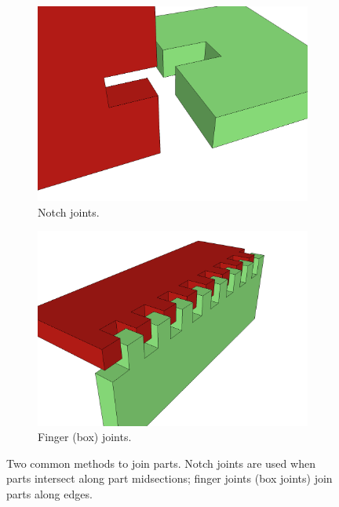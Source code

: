 \begin{figure}[t]
  \centering
  \begin{subfigure}[b]{0.4\textwidth}
    \centering
    \includegraphics[width=\textwidth]{img/joint-notch.png}
    \caption{Notch joints.}
    \label{fig:joint-notch}
  \end{subfigure}
  \hspace{8mm}
  \begin{subfigure}[b]{0.4\textwidth}
    \centering
    \includegraphics[width=\textwidth]{img/joint-finger.png}
    \caption{Finger (box) joints.}
    \label{fig:joint-finger}
  \end{subfigure}
  \caption[Two common notch types]{Two common methods to join
      parts. Notch joints are used when parts intersect along part
      midsections; finger joints (box joints) join parts along edges.}
  \label{fig:joint}
\end{figure}
